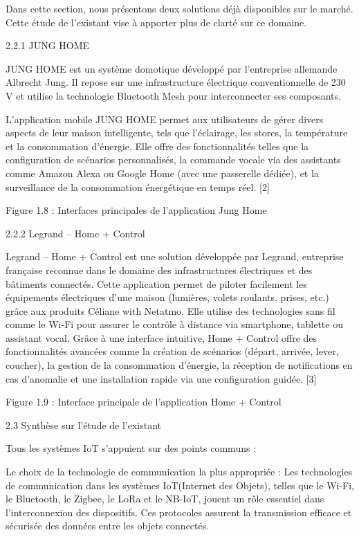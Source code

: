 \documentclass{article}
\begin{document}
Dans cette section, nous présentons deux solutions déjà disponibles sur le marché. Cette étude de l'existant vise à apporter plus de clarté sur ce domaine.

2.2.1 JUNG HOME

JUNG HOME est un système domotique développé par l'entreprise allemande Albrecht Jung. Il repose sur une infrastructure électrique conventionnelle de 230 V et utilise la technologie Bluetooth Mesh pour interconnecter ses composants. 

L'application mobile JUNG HOME permet aux utilisateurs de gérer divers aspects de leur maison intelligente, tels que l'éclairage, les stores, la température et la consommation d'énergie. Elle offre des fonctionnalités telles que la configuration de scénarios personnalisés, la commande vocale via des assistants comme Amazon Alexa ou Google Home (avec une passerelle dédiée), et la surveillance de la consommation énergétique en temps réel. [2]

Figure 1.8 : Interfaces principales de l’application Jung Home

2.2.2 Legrand – Home + Control

Legrand – Home + Control est une solution développée par Legrand, entreprise française reconnue dans le domaine des infrastructures électriques et des bâtiments connectés. Cette application permet de piloter facilement les équipements électriques d’une maison (lumières, volets roulants, prises, etc.) grâce aux produits Céliane with Netatmo. Elle utilise des technologies sans fil comme le Wi-Fi  pour assurer le contrôle à distance via smartphone, tablette ou assistant vocal. Grâce à une interface intuitive, Home + Control offre des fonctionnalités avancées comme la création de scénarios (départ, arrivée, lever, coucher), la gestion de la consommation d’énergie, la réception de notifications en cas d’anomalie et une installation rapide via une configuration guidée. [3]

Figure 1.9 : Interface principale de l’application Home + Control

2.3 Synthèse sur l’étude de l’existant

Tous les systèmes IoT s'appuient sur des points communs :

Le choix de la technologie de communication la plus appropriée : Les technologies de communication dans les systèmes IoT(Internet des Objets), telles que le Wi-Fi, le Bluetooth, le Zigbee, le LoRa et le NB-IoT, jouent un rôle essentiel dans l'interconnexion des dispositifs. Ces protocoles assurent la transmission efficace et sécurisée des données entre les objets connectés.
\end{document}
